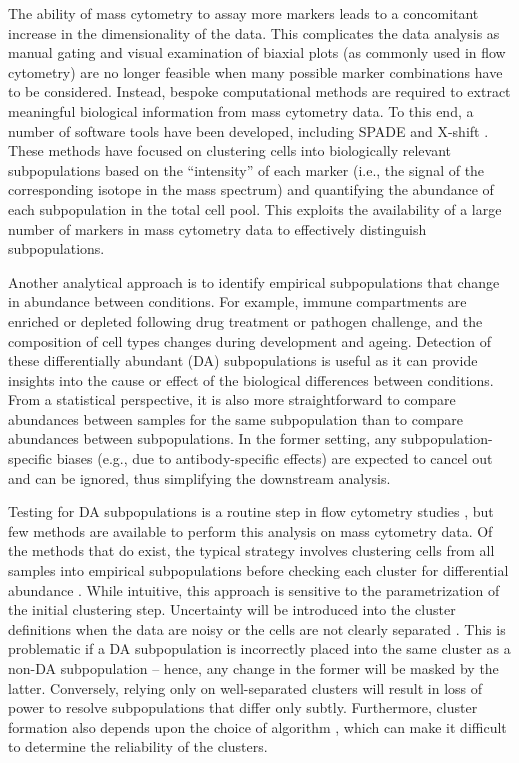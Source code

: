 \documentclass{article}
\begin{document}
The ability of mass cytometry to assay more markers leads to a concomitant increase in the dimensionality of the data.
This complicates the data analysis as manual gating and visual examination of biaxial plots (as commonly used in flow cytometry) are no longer feasible when many possible marker combinations have to be considered.
Instead, bespoke computational methods are required to extract meaningful biological information from mass cytometry data. 
To this end, a number of software tools have been developed, including SPADE \cite{qiu2011extracting} and X-shift \cite{samusik2016automated}.
These methods have focused on clustering cells into biologically relevant subpopulations based on the ``intensity'' of each marker (i.e., the signal of the corresponding isotope in the mass spectrum) and quantifying the abundance of each subpopulation in the total cell pool.
This exploits the availability of a large number of markers in mass cytometry data to effectively distinguish subpopulations.

Another analytical approach is to identify empirical subpopulations that change in abundance between conditions.
For example, immune compartments are enriched or depleted following drug treatment or pathogen challenge, and the composition of cell types changes during development and ageing.
Detection of these differentially abundant (DA) subpopulations is useful as it can provide insights into the cause or effect of the biological differences between conditions.
From a statistical perspective, it is also more straightforward to compare abundances between samples for the same subpopulation than to compare abundances between subpopulations.
In the former setting, any subpopulation-specific biases (e.g., due to antibody-specific effects) are expected to cancel out and can be ignored, thus simplifying the downstream analysis.

Testing for DA subpopulations is a routine step in flow cytometry studies \cite{saeys2016computational,mittag2011recent}, but few methods are available to perform this analysis on mass cytometry data.
Of the methods that do exist, the typical strategy involves clustering cells from all samples into empirical subpopulations before checking each cluster for differential abundance \cite{anchang2016visualization,bruggner2014automated}.
While intuitive, this approach is sensitive to the parametrization of the initial clustering step.
Uncertainty will be introduced into the cluster definitions when the data are noisy or the cells are not clearly separated \cite{suzuki2006pvclust,kerr2001bootstrapping}.
This is problematic if a DA subpopulation is incorrectly placed into the same cluster as a non-DA subpopulation -- hence, any change in the former will be masked by the latter.
Conversely, relying only on well-separated clusters will result in loss of power to resolve subpopulations that differ only subtly.
Furthermore, cluster formation also depends upon the choice of algorithm \cite{datta2003comparisons,wiwie2015comparing}, which can make it difficult to determine the reliability of the clusters.
\end{document}
